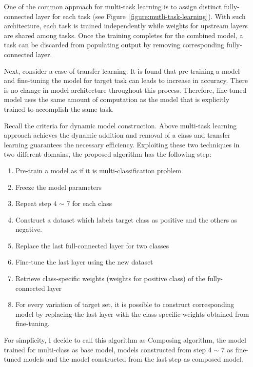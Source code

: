 \documentclass{article}
\begin{document}
One of the common approach for multi-task learning is to assign distinct fully-connected layer for each task (see Figure~\ref{figure:mutli-task-learning}). With such architecture, each task is trained independently while weights for upstream layers are shared among tasks. Once the training completes for the combined model, a task can be discarded from populating output by removing corresponding fully-connected layer.

Next, consider a case of transfer learning. It is found that pre-training a model and fine-tuning the model for target task can leads to increase in accuracy. There is no change in model architecture throughout this process. Therefore, fine-tuned model uses the same amount of computation as the model that is explicitly trained to accomplish the same task.

Recall the criteria for dynamic model construction. Above multi-task learning approach achieves the dynamic addition and removal of a class and transfer learning guarantees the necessary efficiency. Exploiting these two techniques in two different domains, the proposed algorithm has the following step:

\begin{enumerate}
    \item Pre-train a model as if it is multi-classification problem
    \item Freeze the model parameters
    \item Repeat step 4 $\sim$ 7 for each class
    \item Construct a dataset which labels target class as positive and the others as negative.
    \item Replace the last full-connected layer for two classes
    \item Fine-tune the last layer using the new dataset
    \item Retrieve class-specific weights (weights for positive class) of the fully-connected layer
    \item For every variation of target set, it is possible to construct corresponding model by replacing the last layer with the class-specific weights obtained from fine-tuning.
\end{enumerate}

For simplicity, I decide to call this algorithm as Composing algorithm, the model trained for multi-class as base model, models constructed from step 4 $\sim$ 7 as fine-tuned models and the model constructed from the last step as composed model.
\end{document}
